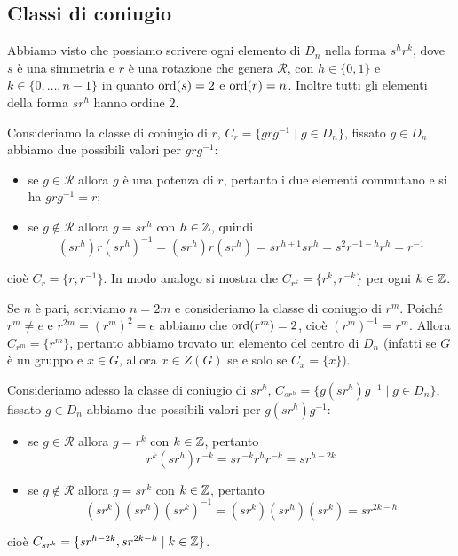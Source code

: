 \documentclass[11pt]{scrartcl}
\begin{document}
\subsection{Classi di coniugio}

Abbiamo visto che possiamo scrivere ogni elemento di $D_n$ nella forma
 $s^hr^k$, dove $s$ è una simmetria e $r$ è una rotazione che genera 
 $\mathcal{R}$, con $h \in \{0, 1\}$ e $k \in \{0, \ldots, n - 1\}$
in quanto $\operatorname{ord}(s)= 2$ e $\operatorname{ord}(r) = n$. Inoltre tutti gli elementi della
forma $sr^h$ hanno ordine $2$.

Consideriamo la classe di coniugio di $r$, $C_r = \{grg^{-1}\mid g \in D_n\}$,
fissato $g \in D_n$ abbiamo due possibili valori per $grg^{-1}$:
\begin{itemize}
    \item se $g \in \mathcal{R}$ allora $g$ è una potenza di $r$, pertanto i
    due elementi commutano e si ha $grg^{-1} = r$;
    \item se $g\notin\mathcal{R}$ allora $g = sr^h$ con $h \in \mathbb Z$, quindi
    \[
        (sr^h)r(sr^h)^{-1} = (sr^h)r(sr^h) = sr^{h + 1}sr^h = s^2r^{-1-h}r^h = r^{-1}
    \]
\end{itemize}
cioè $C_r = \{r, r^{-1}\}$. In modo analogo si mostra che $C_{r^k} = \{r^k, r^{-k}\}$
per ogni $k \in \mathbb Z$.

\begin{remark}
    Se $n$ è pari, scriviamo $n = 2m$ e consideriamo la classe di coniugio
    di $r^m$. Poiché $r^m \neq e$ e $r^{2m} = (r^m)^2 = e$ abbiamo che
    $\operatorname{ord}(r^m) = 2$, cioè $(r^m)^{-1} = r^m$. Allora $C_{r^m} = \{r^m\}$,
    pertanto abbiamo trovato un elemento del centro di $D_n$ (infatti se $G$
    è un gruppo e $x \in G$, allora $x \in Z(G)$ se e solo se $C_x = \{x\}$).
\end{remark}

Consideriamo adesso la classe di coniugio di $sr^h$, $C_{sr^h} = 
\{g(sr^h)g^{-1}\mid g\in D_n\}$, fissato $g \in D_n$ abbiamo due possibili
valori per $g(sr^h)g^{-1}$:
\begin{itemize}
    \item se $g \in \mathcal{R}$ allora $g = r^k$ con $k \in \mathbb Z$, pertanto
    \[
        r^k(sr^h)r^{-k} = sr^{-k}r^h r^{-k} = sr^{h - 2k}
    \]
    \item se $g \notin \mathcal{R}$ allora $g = sr^k$ con $k \in \mathbb Z$, pertanto
    \[
        (sr^k)(sr^h)(sr^k)^{-1} = (sr^k)(sr^h)(sr^k) = sr^{2k - h}
    \]
\end{itemize}
cioè $C_{sr^k} = \{sr^{h - 2k}, sr^{2k - h}\mid k \in \mathbb Z\}$. 
\end{document}
